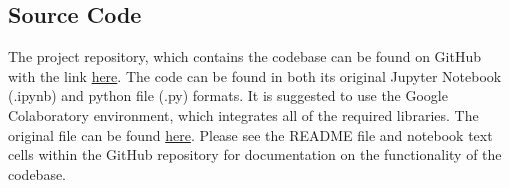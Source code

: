 \documentclass[10pt,onecolumn,letterpaper]{article}
\begin{document}
\subsection{Source Code}

The project repository, which contains the codebase can be found on GitHub with the link \href{https://github.com/twutang/SXNP-Factor-Models}{here}. The code can be found in both its original Jupyter Notebook (.ipynb) and python file (.py) formats. It is suggested to use the Google Colaboratory environment, which integrates all of the required libraries. The original file can be found \href{https://colab.research.google.com/drive/1IHPEI-sPNSS0rKdFThywR4LTpeOt0Z_y}{here}. Please see the README file and notebook text cells within the GitHub repository for documentation on the functionality of the codebase. 
\end{document}

